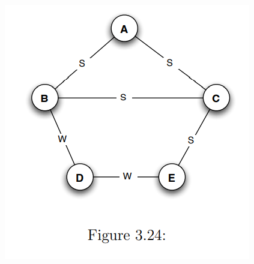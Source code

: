 \documentclass[11pt]{article}
\begin{document}
\begin{enumerate}
\begin{center}
	\includegraphics[scale=0.6]{Figure_3_24}
\end{center}
\end{enumerate}
\end{document}
